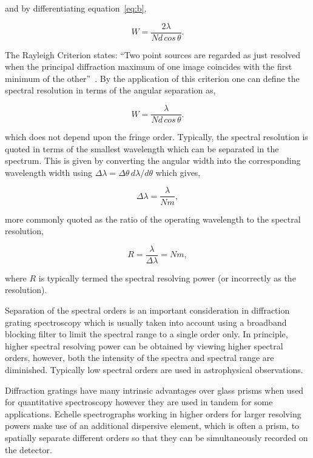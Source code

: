 \noindent and by differentiating equation~\ref{eq:b},

\begin{equation}
    W = \frac{2\lambda}{Nd\,cos\,\theta}.\label{eq:d}
\end{equation}

\noindent The Rayleigh Criterion states: ``Two point sources are regarded as just resolved when the principal diffraction maximum of one image coincides with the first minimum of the other''~\citep{1880MNRAS..40..254R}.
By the application of this criterion one can define the spectral resolution in terms of the angular separation as,

\begin{equation}
    W = \frac{\lambda}{Nd\,cos\,\theta}.\label{eq:e}
\end{equation}

\noindent which does not depend upon the fringe order.
Typically, the spectral resolution is quoted in terms of the smallest wavelength which can be separated in the spectrum.
This is given by converting the angular width into the corresponding wavelength width using $\Delta\lambda = \Delta\theta\,d\lambda/d\theta$ which gives,

\begin{equation}
    \Delta\lambda = \frac{\lambda}{Nm},\label{eq:f}
\end{equation}

\noindent more commonly quoted as the ratio of the operating wavelength to the spectral resolution,

\begin{equation}
    R = \frac{\lambda}{\Delta\lambda} = Nm,\label{eq:g}
\end{equation}

\noindent where $R$ is typically termed the spectral resolving power (or incorrectly as the resolution).

Separation of the spectral orders is an important consideration in diffraction grating spectroscopy which is usually taken into account using a broadband blocking filter to limit the spectral range to a single order only.
In principle, higher spectral resolving power can be obtained by viewing higher spectral orders, however, both the intensity of the spectra and spectral range are diminished.
Typically low spectral orders are used in astrophysical observations.

Diffraction gratings have many intrinsic advantages over glass prisms when used for quantitative spectroscopy however they are used in tandem for some applications.
Echelle spectrographs working in higher orders for larger resolving powers make use of an additional dispersive element, which is often a prism, to spatially separate different orders so that they can be simultaneously recorded on the detector.

